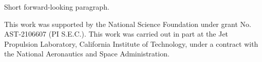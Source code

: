 \documentclass[twocolumn]{aastex631}
\begin{document}
Short forward-looking paragraph.

\begin{acknowledgments}

This work was supported by the National Science Foundation under grant No. AST-2106607 (PI S.E.C.). This work was carried out in part at the Jet Propulsion Laboratory, California Institute of Technology, under a contract with the National Aeronautics and Space Administration.

\end{acknowledgments}


\end{document}
